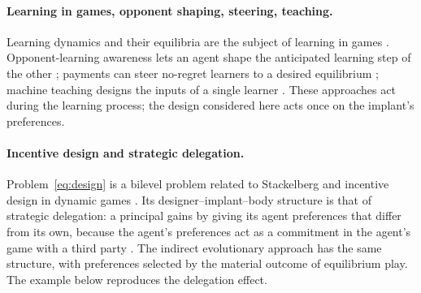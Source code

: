 \documentclass[11pt,a4paper]{article}
\begin{document}
\paragraph{Learning in games, opponent shaping, steering, teaching.}
Learning dynamics and their equilibria are the subject of learning in games
\citep{FudenbergLevine1998,Chasnov2020}. Opponent-learning awareness lets an agent shape
the anticipated learning step of the other \citep{Foerster2018}; payments can steer
no-regret learners to a desired equilibrium \citep{ZhangSteering2023}; machine teaching
designs the inputs of a single learner \citep{Zhu2015}. These approaches act during the
learning process; the design considered here acts once on the implant's preferences.

\paragraph{Incentive design and strategic delegation.}
Problem~\eqref{eq:design} is a bilevel problem related to Stackelberg and incentive
design in dynamic games \citep{BasarOlsder1999,HoLuhOlsder1982,Ratliff2019}. Its
designer--implant--body structure is that of strategic delegation: a principal gains by
giving its agent preferences that differ from its own, because the agent's preferences
act as a commitment in the agent's game with a third party
\citep{Vickers1985,FershtmanJudd1987}. The indirect evolutionary approach
\citep{GuthYaari1992} has the same structure, with preferences selected by the material
outcome of equilibrium play. The example below reproduces the delegation effect.
\end{document}

